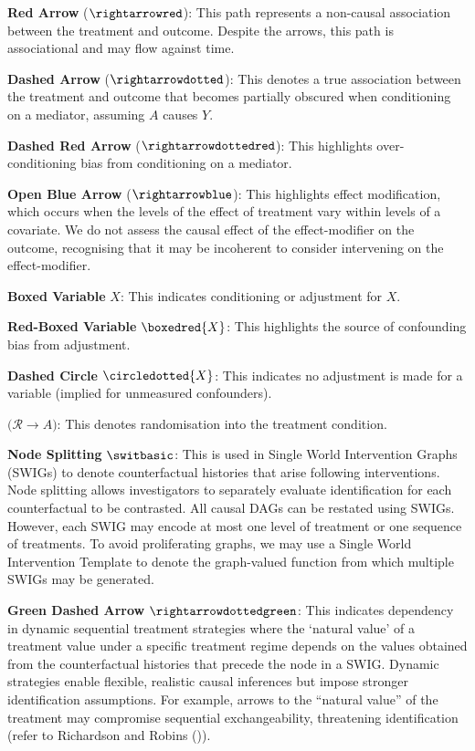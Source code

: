 \documentclass[
  single column]{article}
\begin{document}
\textbf{Red Arrow} (\(\rightarrowred\)): This path represents a
non-causal association between the treatment and outcome. Despite the
arrows, this path is associational and may flow against time.

\textbf{Dashed Arrow} (\(\rightarrowdotted\)): This denotes a true
association between the treatment and outcome that becomes partially
obscured when conditioning on a mediator, assuming \(A\) causes \(Y\).

\textbf{Dashed Red Arrow} (\(\rightarrowdottedred\)): This highlights
over-conditioning bias from conditioning on a mediator.

\textbf{Open Blue Arrow} (\(\rightarrowblue\)): This highlights effect
modification, which occurs when the levels of the effect of treatment
vary within levels of a covariate. We do not assess the causal effect of
the effect-modifier on the outcome, recognising that it may be
incoherent to consider intervening on the effect-modifier.

\textbf{Boxed Variable} \(\boxed{X}\): This indicates conditioning or
adjustment for \(X\).

\textbf{Red-Boxed Variable} \(\boxedred{X}\): This highlights the source
of confounding bias from adjustment.

\textbf{Dashed Circle} \(\circledotted{X}\): This indicates no
adjustment is made for a variable (implied for unmeasured confounders).

\textbf{\(\big(\mathcal{R} \rightarrow A\big)\)}: This denotes
randomisation into the treatment condition.

\textbf{Node Splitting} \(\switbasic\): This is used in Single World
Intervention Graphs (SWIGs) to denote counterfactual histories that
arise following interventions. Node splitting allows investigators to
separately evaluate identification for each counterfactual to be
contrasted. All causal DAGs can be restated using SWIGs. However, each
SWIG may encode at most one level of treatment or one sequence of
treatments. To avoid proliferating graphs, we may use a Single World
Intervention Template to denote the graph-valued function from which
multiple SWIGs may be generated.

\textbf{Green Dashed Arrow} \(\rightarrowdottedgreen\): This indicates
dependency in dynamic sequential treatment strategies where the `natural
value' of a treatment value under a specific treatment regime depends on
the values obtained from the counterfactual histories that precede the
node in a SWIG. Dynamic strategies enable flexible, realistic causal
inferences but impose stronger identification assumptions. For example,
arrows to the ``natural value'' of the treatment may compromise
sequential exchangeability, threatening identification (refer to
Richardson and Robins ()).
\end{document}
